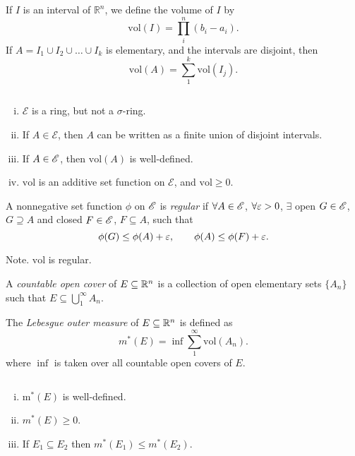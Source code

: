 \documentclass[11pt]{article}
\begin{document}
\begin{definition}
    If $I$ is an interval of $\mathbb{R}^n$, we define the volume of $I$ by $$\mathrm{vol}(I) = \prod_i^n (b_i - a_i).$$
    If $A = I_1 \cup I_2 \cup \dots \cup I_k$ is elementary, and the intervals are disjoint, then $$\mathrm{vol}(A) = \sum_1^k \mathrm{vol}(I_j).$$
\end{definition}

\begin{remark} $\text{}$
  \begin{enumerate} [(i), nosep, left=0pt]
  \item $\mathscr{E}$ is a ring, but not a $\sigma$-ring.
  \item If $A \in \mathscr{E}$, then $A$ can be written as a finite union of disjoint intervals.
  \item If $A \in \mathscr{E}$, then $\mathrm{vol}(A)$ is well-defined.
  \item $\mathrm{vol}$ is an additive set function on $\mathscr{E}$, and $\mathrm{vol} \ge 0$.
  \end{enumerate}
\end{remark}

\begin{definition}
  A nonnegative set function $\phi$ on $\mathscr{E}$ is \emph{regular} if $\forall A \in \mathscr{E}$, $\forall \varepsilon > 0$, $\exists$ open $G \in \mathscr{E}$, $G \supseteq A$ and closed $F \in \mathscr{E}$, $F \subseteq A$, such that $$\phi(G) \le \phi(A) + \varepsilon, \qquad \phi(A) \le \phi(F) + \varepsilon.$$
\end{definition}

Note. $\mathrm{vol}$ is regular.

\begin{definition}
  A \emph{countable open cover} of $E \subseteq \mathbb{R}^{n}$ is a collection of open elementary sets $\{ A_{n} \}$ such that $E \subseteq \bigcup_{1}^{\infty} A_{n}$.
\end{definition}

\begin{definition}
  The \emph{Lebesgue outer measure} of $E \subseteq \mathbb{R}^{n}$ is defined as $$m^{*} (E) = \inf \sum_{1}^{\infty} \mathrm{vol}(A_{n}).$$ where $\inf$ is taken over all countable open covers of $E$.
\end{definition}

\begin{remark} $\text{}$
  \begin{enumerate} [(i), nosep, left=0pt]
       \item  m$^{*}(E)$ is well-defined.
       \item  $m^{*}(E) \ge 0$.
       \item  If $E_{1} \subseteq E_{2}$ then $m^{*}(E_{1}) \le m^{*}(E_{2})$.
  \end{enumerate}
\end{remark}
\end{document}
